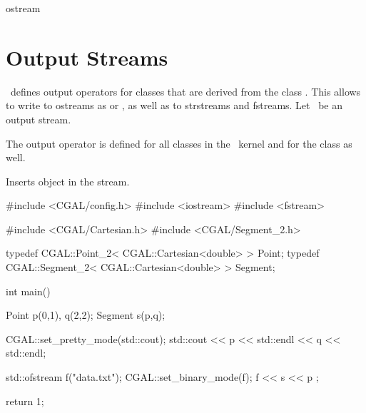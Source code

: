 \begin{ccClass} {ostream}
\section{Output Streams}

\ccDefinition
\cgal\  defines output operators for classes that are derived
from the class . This allows to write to ostreams
as  or , as well as to strstreams
and fstreams. Let \ccVar\  be an output stream.

\ccOperations
The output operator is defined for all classes in the \cgal\ kernel and for the class  as well.

{Inserts object  in the stream. }


\ccExample

\begin{cprog}

#include <CGAL/config.h>
#include <iostream>
#include <fstream>

#include <CGAL/Cartesian.h>
#include <CGAL/Segment_2.h>

typedef CGAL::Point_2< CGAL::Cartesian<double> >     Point;
typedef CGAL::Segment_2< CGAL::Cartesian<double> >   Segment;

int main()
{
    Point p(0,1), q(2,2);
    Segment s(p,q);

    CGAL::set_pretty_mode(std::cout);
    std::cout << p << std::endl << q  << std::endl;

    std::ofstream f("data.txt");
    CGAL::set_binary_mode(f);
    f << s << p ;

    return 1;
}
\end{cprog} 
\end{ccClass} 



